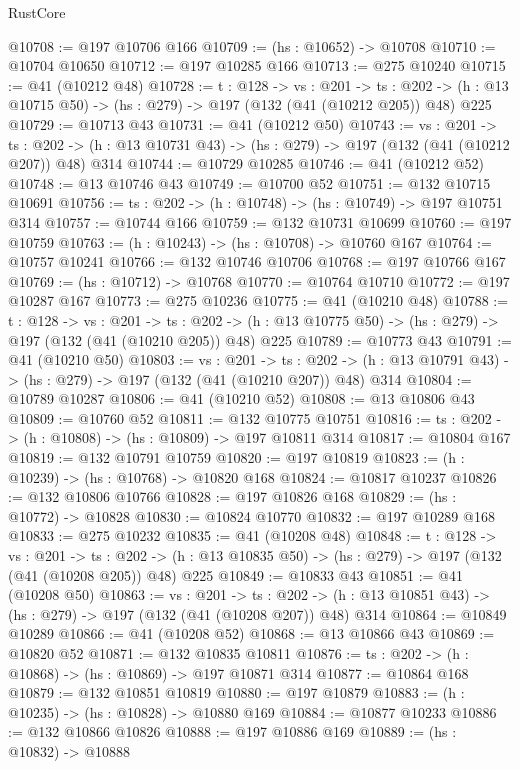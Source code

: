\begin{lexlean}{RustCore}
\begin{coremodule}
@10708 := @197 @10706 @166
@10709 := (hs : @10652) -> @10708
@10710 := @10704 @10650
@10712 := @197 @10285 @166
@10713 := @275 @10240
@10715 := @41 (@10212 @48)
@10728 := {t : @128} ->
  {vs : @201} ->
  {ts : @202} -> (h : @13 @10715 @50) -> (hs : @279) -> @197 (@132 (@41 (@10212 @205)) @48) @225
@10729 := @10713 @43
@10731 := @41 (@10212 @50)
@10743 := {vs : @201} ->
  {ts : @202} -> (h : @13 @10731 @43) -> (hs : @279) -> @197 (@132 (@41 (@10212 @207)) @48) @314
@10744 := @10729 @10285
@10746 := @41 (@10212 @52)
@10748 := @13 @10746 @43
@10749 := @10700 @52
@10751 := @132 @10715 @10691
@10756 := {ts : @202} -> (h : @10748) -> (hs : @10749) -> @197 @10751 @314
@10757 := @10744 @166
@10759 := @132 @10731 @10699
@10760 := @197 @10759
@10763 := (h : @10243) -> (hs : @10708) -> @10760 @167
@10764 := @10757 @10241
@10766 := @132 @10746 @10706
@10768 := @197 @10766 @167
@10769 := (hs : @10712) -> @10768
@10770 := @10764 @10710
@10772 := @197 @10287 @167
@10773 := @275 @10236
@10775 := @41 (@10210 @48)
@10788 := {t : @128} ->
  {vs : @201} ->
  {ts : @202} -> (h : @13 @10775 @50) -> (hs : @279) -> @197 (@132 (@41 (@10210 @205)) @48) @225
@10789 := @10773 @43
@10791 := @41 (@10210 @50)
@10803 := {vs : @201} ->
  {ts : @202} -> (h : @13 @10791 @43) -> (hs : @279) -> @197 (@132 (@41 (@10210 @207)) @48) @314
@10804 := @10789 @10287
@10806 := @41 (@10210 @52)
@10808 := @13 @10806 @43
@10809 := @10760 @52
@10811 := @132 @10775 @10751
@10816 := {ts : @202} -> (h : @10808) -> (hs : @10809) -> @197 @10811 @314
@10817 := @10804 @167
@10819 := @132 @10791 @10759
@10820 := @197 @10819
@10823 := (h : @10239) -> (hs : @10768) -> @10820 @168
@10824 := @10817 @10237
@10826 := @132 @10806 @10766
@10828 := @197 @10826 @168
@10829 := (hs : @10772) -> @10828
@10830 := @10824 @10770
@10832 := @197 @10289 @168
@10833 := @275 @10232
@10835 := @41 (@10208 @48)
@10848 := {t : @128} ->
  {vs : @201} ->
  {ts : @202} -> (h : @13 @10835 @50) -> (hs : @279) -> @197 (@132 (@41 (@10208 @205)) @48) @225
@10849 := @10833 @43
@10851 := @41 (@10208 @50)
@10863 := {vs : @201} ->
  {ts : @202} -> (h : @13 @10851 @43) -> (hs : @279) -> @197 (@132 (@41 (@10208 @207)) @48) @314
@10864 := @10849 @10289
@10866 := @41 (@10208 @52)
@10868 := @13 @10866 @43
@10869 := @10820 @52
@10871 := @132 @10835 @10811
@10876 := {ts : @202} -> (h : @10868) -> (hs : @10869) -> @197 @10871 @314
@10877 := @10864 @168
@10879 := @132 @10851 @10819
@10880 := @197 @10879
@10883 := (h : @10235) -> (hs : @10828) -> @10880 @169
@10884 := @10877 @10233
@10886 := @132 @10866 @10826
@10888 := @197 @10886 @169
@10889 := (hs : @10832) -> @10888

\end{coremodule}
\end{lexlean}
